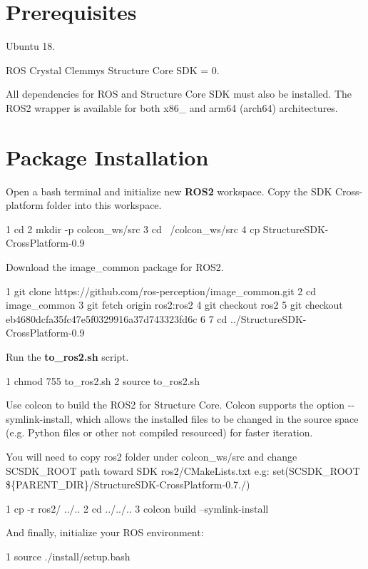 \hypertarget{ros2_install_prerequisites2}{}\section{Prerequisites}\label{ros2_install_prerequisites2}

\begin{DoxyItemize}
\item Ubuntu 18.
\item R\+OS Crystal Clemmys Structure Core S\+DK = 0.
\end{DoxyItemize}

All dependencies for R\+OS and Structure Core S\+DK must also be installed. The R\+O\+S2 wrapper is available for both x86\+\_ and arm64 (arch64) architectures.\hypertarget{ros2_install_package2_installation}{}\section{Package Installation}\label{ros2_install_package2_installation}
Open a bash terminal and initialize new {\bfseries R\+O\+S2} workspace. Copy the S\+DK Cross-\/platform folder into this workspace.


\begin{DoxyCode}
1 cd 
2 mkdir -p colcon\_ws/src 
3 cd ~/colcon\_ws/src
4 cp StructureSDK-CrossPlatform-0.9
\end{DoxyCode}


Download the {\ttfamily image\+\_\+common} package for R\+O\+S2.


\begin{DoxyCode}
1 git clone https://github.com/ros-perception/image\_common.git
2 cd image\_common
3 git fetch origin ros2:ros2
4 git checkout ros2
5 git checkout eb4680dcfa35fc47e5f0329916a37d743323fd6c
6 
7 cd ../StructureSDK-CrossPlatform-0.9
\end{DoxyCode}


Run the {\bfseries to\+\_\+ros2.\+sh} script.


\begin{DoxyCode}
1 chmod 755 to\_ros2.sh
2 source to\_ros2.sh
\end{DoxyCode}


Use colcon to build the R\+O\+S2 for Structure Core. Colcon supports the option {\ttfamily -\/-\/symlink-\/install}, which allows the installed files to be changed in the source space (e.\+g. Python files or other not compiled resourced) for faster iteration.

You will need to copy ros2 folder under colcon\+\_\+ws/src and change S\+C\+S\+D\+K\+\_\+\+R\+O\+OT path toward S\+DK ros2/\+C\+Make\+Lists.\+txt e.\+g\+: set(S\+C\+S\+D\+K\+\_\+\+R\+O\+OT \$\{P\+A\+R\+E\+N\+T\+\_\+\+D\+IR\}/\+Structure\+S\+D\+K-\/\+Cross\+Platform-\/0.7./)


\begin{DoxyCode}
1 cp -r ros2/ ../..
2 cd ../../..
3 colcon build --symlink-install
\end{DoxyCode}


And finally, initialize your R\+OS environment\+:


\begin{DoxyCode}
1 source ./install/setup.bash
\end{DoxyCode}
 